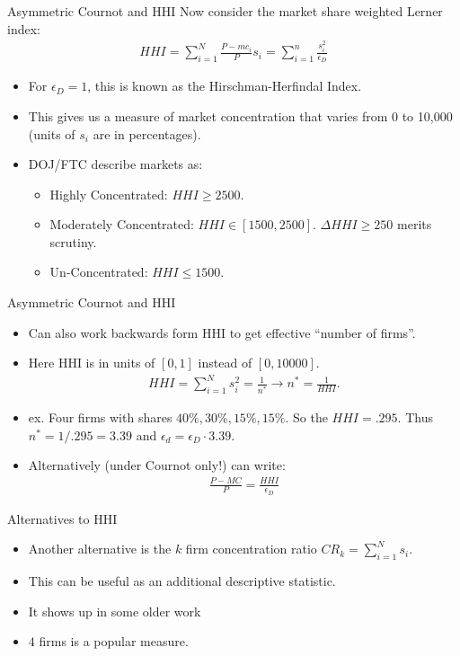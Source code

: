 \documentclass[xcolor=pdftex,dvipsnames,table,mathserif,aspectratio=169]{beamer}
\begin{document}
\begin{frame}{Asymmetric Cournot and HHI}
Now consider the market share weighted Lerner index:
\begin{eqnarray*}
HHI = \sum_{i=1}^N \frac{P - mc_i}{P} s_i = \sum_{i=1}^n \frac{s_i^2}{\epsilon_D}
\end{eqnarray*}
\begin{itemize}
\item For $\epsilon_D =1$, this is known as the \alert{Hirschman-Herfindal Index}.
\item This gives us a measure of \alert{market concentration} that varies from 0 to 10,000 (units of $s_i$ are in percentages).
\item DOJ/FTC describe markets as:
\begin{itemize}
\item Highly Concentrated: $HHI \geq 2500$.
\item Moderately Concentrated: $HHI \in [1500,2500]$. $\Delta HHI \geq 250$ merits scrutiny.
\item Un-Concentrated: $HHI \leq 1500$.
\end{itemize}
\end{itemize}
\end{frame}

\begin{frame}{Asymmetric Cournot and HHI}
\begin{itemize}
\item Can also work backwards form HHI to get effective ``number of firms''.
\item Here HHI is in units of $[0,1]$ instead of $[0,10000]$.
\begin{eqnarray*}
HHI = \sum_{i=1}^N s_i^2 = \frac{1}{n^*} \rightarrow n^{*} = \frac{1}{HHI}.
\end{eqnarray*}
\item ex. Four firms with shares $40\%, 30\%, 15\%, 15\%$. So the $HHI =.295$. Thus $n^{*} = 1/.295 = 3.39$ and $\epsilon_d = \epsilon_D \cdot 3.39$.
\item Alternatively (under Cournot only!) can write:
\begin{eqnarray*}
\frac{P-MC}{P} = \frac{HHI}{\epsilon_D}
\end{eqnarray*}

\end{itemize}
\end{frame}

\begin{frame}{Alternatives to HHI}
\begin{itemize}
\item Another alternative is the $k$ firm concentration ratio $CR_k = \sum_{i=1}^N s_i$.
\item This can be useful as an additional descriptive statistic.
\item It shows up in some older work
\item $4$ firms is a popular measure.
\end{itemize}
\end{frame}
\end{document}
